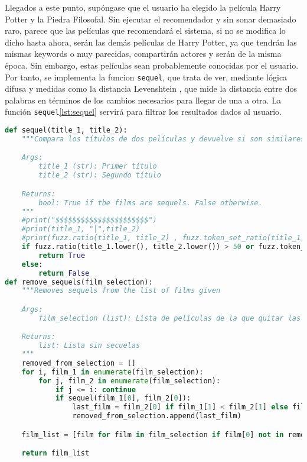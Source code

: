 Llegados a este punto, supóngase que el usuario ha elegido la película Harry Potter y la Piedra Filosofal. Sin ejecutar el recomendador y sin sonar demasiado raro, parece que las películas que recomendará el sistema, si no se modifica lo dicho hasta ahora, serán las demás películas de Harry Potter, ya que tendrán las mismas keywords o muy parecidas, compartirán actores y serán de la misma época. Sin embargo, estas películas sean probablemente conocidas por el usuario. Por tanto, se implementa la funcion \texttt{sequel}, que trata de ver, mediante lógica difusa y medidas como la distancia Levenshtein \cite{levenshtein}, que mide la distancia entre dos palabras en términos de los cambios necesarios para llegar de una a otra. La función \texttt{sequel}\ref{lst:sequel} servirá para filtrar los resultados dados al usuario.
\begin{lstlisting}[language=Python, caption=Determinación de si dos películas son o no secuelas y eliminarlas.]
def sequel(title_1, title_2):   
    """Compara los títulos de dos películas y devuelve si son similares o no

    Args:
        title_1 (str): Primer título
        title_2 (str): Segundo título

    Returns:
        bool: True if the films are sequels. False otherwise.
    """
    #print("$$$$$$$$$$$$$$$$$$$$$$")
    #print(title_1, "|",title_2)
    #print(fuzz.ratio(title_1, title_2) , fuzz.token_set_ratio(title_1, title_2))
    if fuzz.ratio(title_1.lower(), title_2.lower()) > 50 or fuzz.token_set_ratio(title_1.lower(), title_2.lower()) > 60:
        return True
    else:
        return False
def remove_sequels(film_selection):
    """Removes sequels from the list of films given

    Args:
        film_selection (list): Lista de películas de la que quitar las secuelas

    Returns:
        list: Lista sin secuelas
    """ 
    removed_from_selection = []
    for i, film_1 in enumerate(film_selection):
        for j, film_2 in enumerate(film_selection):
            if j <= i: continue 
            if sequel(film_1[0], film_2[0]): 
                last_film = film_2[0] if film_1[1] < film_2[1] else film_1[0]
                removed_from_selection.append(last_film)

    film_list = [film for film in film_selection if film[0] not in removed_from_selection]

    return film_list  
\end{lstlisting}

